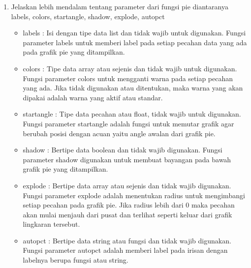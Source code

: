 \begin {enumerate}
		\item Jelaskan lebih mendalam tentang parameter dari fungsi pie diantaranya labels, colors, startangle, shadow, explode, autopct
			\\ 
			\begin{itemize}
	\item labels : Isi dengan tipe data list dan tidak wajib untuk digunakan. Fungsi parameter labels untuk memberi label pada setiap pecahan data yang ada pada grafik pie yang ditampilkan.
	\item colors : Tipe data array atau sejenis dan tidak wajib untuk digunakan. Fungsi parameter colors untuk mengganti warna pada setiap pecahan yang ada. Jika tidak digunakan atau ditentukan, maka warna yang akan dipakai adalah warna yang aktif atau standar.
	\item startangle : Tipe data pecahan atau float, tidak wajib untuk digunakan. Fungsi parameter startangle adalah fungsi untuk memutar grafik agar berubah posisi dengan acuan yaitu angle awalan dari grafik pie.
	\item shadow : Bertipe data boolean dan tidak wajib digunakan. Fungsi parameter shadow digunakan untuk membuat bayangan pada bawah grafik pie yang ditampilkan. 
	\item explode : Bertipe data array atau sejenis dan tidak wajib digunakan. Fungsi parameter explode adalah menentukan radius untuk mengimbangi setiap pecahan pada grafik pie. Jika radius lebih dari 0 maka pecahan akan mulai menjauh dari pusat dan terlihat seperti keluar dari grafik lingkaran tersebut.
	\item autopct : Bertipe data string atau fungsi dan tidak wajib digunakan. Fungsi parameter autopct adalah memberi label pada irisan dengan labelnya berupa fungsi atau string. 
			\end{itemize}
	\end {enumerate}